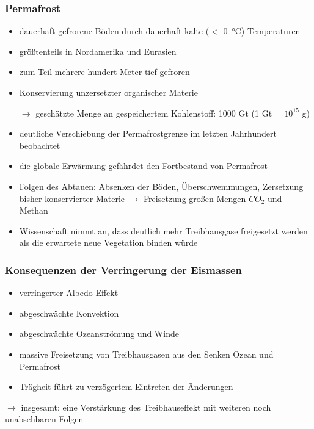 \begin{frame}
	\frametitle{Permafrost}
	\begin{itemize}
		\item dauerhaft gefrorene Böden durch dauerhaft kalte ($<$ \SI{0}{\degreeCelsius}) Temperaturen
		\item größtenteils in Nordamerika und Eurasien
		\item zum Teil mehrere hundert Meter tief gefroren %
		\item Konservierung unzersetzter organischer Materie
		\item [$\rightarrow$] geschätzte Menge an gespeichertem Kohlenstoff: 1000 Gt (1 Gt = $10^15$ g)
		\item deutliche Verschiebung der Permafrostgrenze im letzten Jahrhundert beobachtet %
		\item die globale Erwärmung gefährdet den Fortbestand von Permafrost 
		\item Folgen des Abtauen: Absenken der Böden, Überschwemmungen, Zersetzung bisher konservierter Materie $\rightarrow$ Freisetzung großen Mengen $CO_2$ und Methan
		\item Wissenschaft nimmt an, dass deutlich mehr Treibhausgase freigesetzt werden als die erwartete neue Vegetation binden würde
	\end{itemize}
\end{frame}

\begin{frame}
	\frametitle{Konsequenzen der Verringerung der Eismassen}
	\begin{itemize}
		\item verringerter Albedo-Effekt
		\item abgeschwächte Konvektion
		\item abgeschwächte Ozeanströmung und Winde
		\item massive Freisetzung von Treibhausgasen aus den Senken Ozean und Permafrost
		\item Trägheit führt zu verzögertem Eintreten der Änderungen
	\end{itemize}
	
	$\rightarrow$ insgesamt: eine Verstärkung des Treibhauseffekt mit weiteren noch unabsehbaren Folgen
\end{frame}

